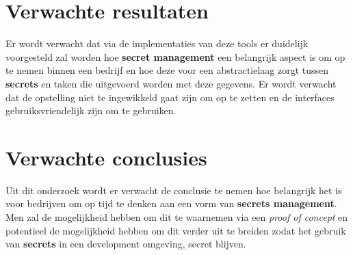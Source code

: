 
\section{Verwachte resultaten}
\label{sec:verwachte_resultaten}

Er wordt verwacht dat via de implementaties van deze tools er duidelijk voorgesteld zal worden hoe \textbf{secret management} een belangrijk aspect is om op te nemen binnen een bedrijf en hoe deze voor een abstractielaag zorgt tussen \textbf{secrets} en taken die uitgevoerd worden met deze gegevens. Er wordt verwacht dat de opstelling niet te ingewikkeld gaat zijn om op te zetten en de interfaces gebruiksvriendelijk zijn om te gebruiken.


\section{Verwachte conclusies}
\label{sec:verwachte_conclusies}

Uit dit onderzoek wordt er verwacht de conclusie te nemen hoe belangrijk het is voor bedrijven om op tijd te denken aan een vorm van \textbf{secrets management}. Men zal de mogelijkheid hebben om dit te waarnemen via een \textit{proof of concept} en potentieel de mogelijkheid hebben om dit verder uit te breiden zodat het gebruik van \textbf{secrets} in een development omgeving, secret blijven.

